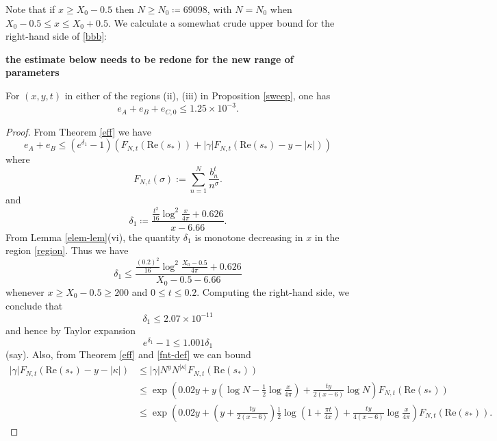 Note that if $x \geq X_0 - 0.5$ then $N \geq N_0 \coloneqq 69098$, with $N=N_0$ when $X_0-0.5 \leq x \leq X_0+0.5$.  We calculate a somewhat crude upper bound for the right-hand side of \eqref{bbb}:

{\bf the estimate below needs to be redone for the new range of parameters}

\begin{lemma}\label{lac} For $(x,y,t)$ in either of the regions (ii), (iii) in Proposition \ref{sweep}, one has
$$ e_A + e_B + e_{C,0} \leq 1.25 \times 10^{-3}.$$
\end{lemma}

\begin{proof}
From Theorem \ref{eff} we have
\begin{equation}\label{eaeb-bound}
 e_A + e_B \leq (e^{\delta_1}-1) (F_{N,t}(\mathrm{Re}(s_*)) + |\gamma| F_{N,t}( \mathrm{Re}(s_*) - y - |\kappa| ) )
\end{equation}
where
\begin{equation}\label{fnt-def}
 F_{N,t}( \sigma ) := \sum_{n=1}^N \frac{b_n^t}{n^\sigma}.
\end{equation}
and
\begin{equation}\label{dela}
 \delta_1 \coloneqq \frac{\frac{t^2}{16} \log^2 \frac{x}{4\pi} + 0.626}{x-6.66}.
\end{equation}
From Lemma \ref{elem-lem}(vi), the quantity $\delta_1$ is monotone decreasing in $x$ in the region \eqref{region}.  Thus we have
\begin{equation}\label{delta1-bound}
 \delta_1 \leq \frac{\frac{(0.2)^2}{16} \log^2 \frac{X_0-0.5}{4\pi} + 0.626}{X_0-0.5-6.66}
\end{equation}
whenever $x \geq X_0-0.5 \geq 200$ and $0 \leq t \leq 0.2$.  Computing the right-hand side, we conclude that
$$  \delta_1 \leq 2.07 \times 10^{-11}$$
and hence by Taylor expansion
$$ e^{\delta_1} - 1 \leq 1.001 \delta_1$$
(say).
Also, from Theorem \ref{eff} and \eqref{fnt-def} we can bound
\begin{align*}
|\gamma| F_{N,t}( \mathrm{Re}(s_*) - y - |\kappa| ) &\leq |\gamma| N^y N^{|\kappa|} F_{N,t}( \mathrm{Re}(s_*) ) \\
&\leq \exp( 0.02 y + y (\log N - \frac{1}{2} \log \frac{x}{4\pi}) + \frac{ty}{2(x-6)} \log N ) F_{N,t}( \mathrm{Re}(s_*) )  \\
&\leq \exp( 0.02 y + (y + \frac{ty}{2(x-6)}) \frac{1}{2} \log(1 + \frac{\pi t}{4x}) + \frac{ty}{4(x-6)} \log \frac{x}{4\pi} ) F_{N,t}( \mathrm{Re}(s_*) ).
\end{align*}

\end{proof}
